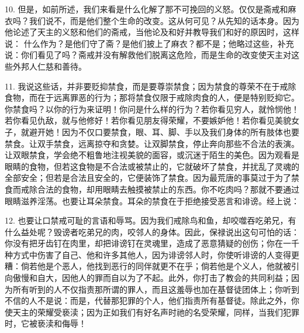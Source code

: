 10. 但是，如前所述，我们来看是什么化解了那不可挽回的义怒。仅仅是斋戒和麻衣吗？我们说不，而是他们整个生命的改变。这从何可见？从先知的话本身。因为他论述了天主的义怒和他们的斋戒，当他论及和好并教导我们和好的原因时，这样说： 什么作为？是他们守了斋？是他们披上了麻衣？都不是；他略过这些，补充说：你们看见了吗？斋戒并没有解救他们脱离这危险，而是生命的改变使天主对这些外邦人仁慈和善待。\par

11. 我说这些话，并非要贬抑禁食，而是要尊崇禁食；因为禁食的尊荣不在于戒除食物，而在于远离罪恶的行为；那将禁食仅限于戒除肉食的人，便是特别贬抑它。你禁食吗？以你的行为来证明！你问是什么样的行为？若你看见穷人，就怜悯他！若你看见仇敌，就与他修好！若你看见朋友得荣耀，不要嫉妒他！若你看见美貌女子，就避开她！因为不仅口要禁食，眼、耳、脚、手以及我们身体的所有肢体也要禁食。让双手禁食，远离掠夺和贪婪。让双脚禁食，停止奔向那些不合法的表演。让双眼禁食，学会绝不粗鲁地注视美貌的面容，或沉迷于陌生的美色。因为观看是眼睛的食物，但若这食物是不合法或被禁止的，它就破坏了禁食，并扰乱了灵魂的全部安全；但若是合法且安全的，它便装饰了禁食。因为最荒唐的事莫过于为了禁食而戒除合法的食物，却用眼睛去触摸被禁止的东西。你不吃肉吗？那就不要通过眼睛滋养淫荡。也要让耳朵禁食。耳朵的禁食在于拒绝接受恶言和诽谤。经上说：\par

12. 也要让口禁戒可耻的言语和辱骂。因为我们戒除鸟和鱼，却咬噬吞吃弟兄，有什么益处呢？毁谤者吃弟兄的肉，咬邻人的身体。因此，保禄说出这句可怕的话：你没有把牙齿钉在肉里，却把诽谤钉在灵魂里，造成了恶意猜疑的创伤；你在一千种方式中伤害了自己、他和许多其他人，因为诽谤邻人时，你使听诽谤的人变得更糟：倘若他是个恶人，他找到恶行的同伴就更不在乎；倘若他是个义人，他就被引向傲慢和自大，因他人的罪而自以为了不起。此外，你打击了教会的共同利益；因为所有听到的人不仅指责那所谓的罪人，而且这羞辱也加在基督徒团体上；你听到不信的人不是说：而是，代替那犯罪的个人，他们指责所有基督徒。除此之外，你使天主的荣耀受亵渎；因为正如我们有好名声时祂的名受荣耀，同样，当我们犯罪时，它被亵渎和侮辱！\par

